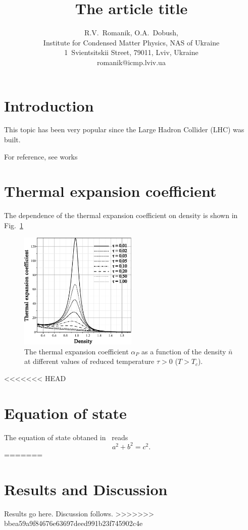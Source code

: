 \documentclass[12pt]{article}
\title{The article title}
\author{R.V.~Romanik, O.A.~Dobush,
	\\ \small Institute for Condensed Matter Physics, NAS of Ukraine 
	\\ \small 1~Svientsitskii Street, 79011, Lviv, Ukraine 
	\\ \small romanik@icmp.lviv.ua}
\begin{document}
	
	\maketitle
	
	
	\section{Introduction}
	This topic has been very popular since the Large Hadron Collider (LHC) was built.
	
	For reference, see works~\cite{Cooper}
	
	\section{Thermal expansion coefficient}
	The dependence of the thermal expansion coefficient on density is shown in Fig.~\ref{fig4}
	
	\begin{figure}[h!]
		\centering \includegraphics[width=0.5\textwidth]{f4.pdf}
		\vskip-3mm\caption{The thermal expansion coefficient $\alpha_P$ as a function of the density $\bar n$ at different values of reduced temperature $\tau > 0$ ($T > T_c$). 
		}\label{fig4}
	\end{figure}
	
<<<<<<< HEAD
	\section{Equation of state}
	The equation of state obtaned in~\cite{KozitskyKozlovskiiDobush2020} reads
	\begin{equation}
		a^2 + b^2 = c^2.
	\end{equation}
=======
	\section{Results and Discussion}
	Results go here. Discussion follows.
>>>>>>> bbea59a9f84676e63697deed991b23f745902c4e
	
	
	
\end{document}
